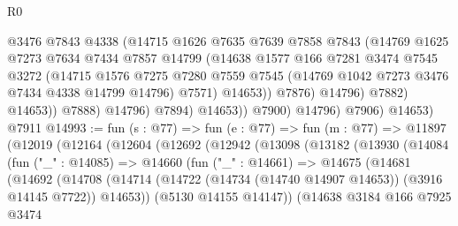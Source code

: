 \begin{lexlean}{R0}
\begin{coremodule}
                              @3476
                              @7843
                              @4338
                              (@14715
                                @1626
                                @7635
                                @7639
                                @7858
                                @7843
                                (@14769
                                  @1625
                                  @7273
                                  @7634
                                  @7434
                                  @7857
                                  @14799
                                  (@14638
                                    @1577
                                    @166
                                    @7281
                                    @3474
                                    @7545
                                    @3272
                                    (@14715
                                      @1576
                                      @7275
                                      @7280
                                      @7559
                                      @7545
                                      (@14769 @1042 @7273 @3476 @7434 @4338 @14799 @14796)
                                      @7571)
                                    @14653))
                                @7876)
                              @14796)
                            @7882)
                          @14653))
                      @7888)
                    @14796)
                  @7894)
                @14653))
            @7900)
          @14796)
        @7906)
      @14653)
    @7911
@14993 := fun (s : @77) =>
  fun (e : @77) =>
  fun (m : @77) =>
  @11897
    (@12019
      (@12164
        (@12604
          (@12692
            (@12942
              (@13098
                (@13182
                  (@13930
                    (@14084
                      (fun ("_" : @14085) =>
                      @14660
                        (fun ("_" : @14661) =>
                        @14675
                          (@14681
                            (@14692
                              (@14708
                                (@14714
                                  (@14722 (@14734 (@14740 @14907 @14653)) (@3916 @14145 @7722))
                                  @14653))
                              (@5130 @14155 @14147))
                            (@14638
                              @3184
                              @166
                              @7925
                              @3474

\end{coremodule}
\end{lexlean}
